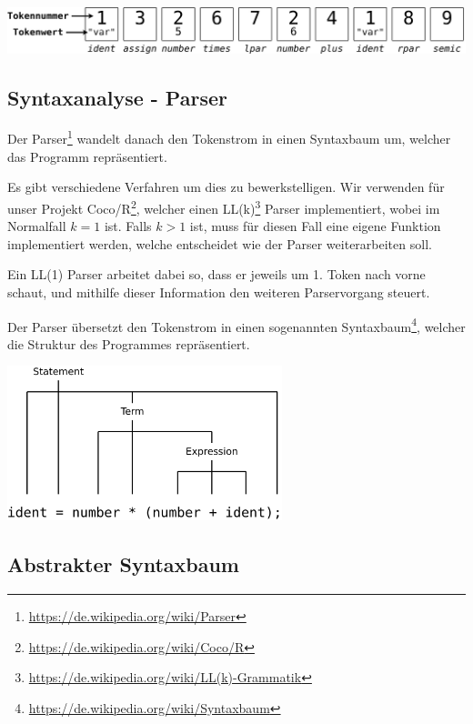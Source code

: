 \includegraphics[width=\textwidth]{./media/images/compiler/scanner_tokenstream.png}

\subsection{Syntaxanalyse - Parser}

Der Parser\footnote{\url{https://de.wikipedia.org/wiki/Parser}} wandelt danach den Tokenstrom in einen Syntaxbaum um, welcher das Programm repräsentiert.

Es gibt verschiedene Verfahren um dies zu bewerkstelligen. Wir verwenden f\"ur unser Projekt Coco/R\footnote{\url{https://de.wikipedia.org/wiki/Coco/R}}, welcher einen LL(k)\footnote{\url{https://de.wikipedia.org/wiki/LL(k)-Grammatik}} Parser implementiert, wobei im Normalfall $k = 1$ ist. Falls $k > 1$ ist, muss f\"ur diesen Fall eine eigene Funktion implementiert werden, welche entscheidet wie der Parser weiterarbeiten soll.

Ein LL(1) Parser arbeitet dabei so, dass er jeweils um 1. Token nach vorne schaut, und mithilfe dieser Information den weiteren Parservorgang steuert.


\newpage


Der Parser \"ubersetzt den Tokenstrom in einen sogenannten Syntaxbaum\footnote{\url{https://de.wikipedia.org/wiki/Syntaxbaum}}, welcher die Struktur des Programmes repr\"asentiert.

\includegraphics[width=0.6\textwidth]{./media/images/compiler/parser_syntaxtree.png}

\subsection{Abstrakter Syntaxbaum}

